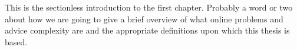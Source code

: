 
This is the sectionless introduction to the first chapter. Probably a word
or two about how we are going to give a brief overview of what online
problems and advice complexity are and the appropriate definitions upon
which this thesis is based.
